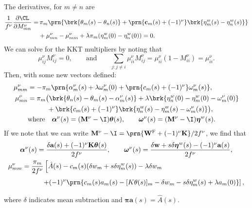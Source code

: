 \documentclass[12pt]{article}
\newcommand{\eqm}{\pi}
\newcommand{\eq}{\boldsymbol{\eqm}}
\newcommand{\etwm}{\eta^w}
\newcommand{\etw}{\boldsymbol{\eta}^w}
\newcommand{\thbm}{\theta}
\newcommand{\thb}{\boldsymbol{\thbm}}
\newcommand{\ombm}{\omega}
\newcommand{\omb}{\boldsymbol{\ombm}}
\newcommand{\albm}{\alpha}
\newcommand{\alb}{\boldsymbol{\albm}}
\newcommand{\wm}{w}
\newcommand{\w}{\mathbf{\wm}}
\newcommand{\Wm}{W}
\newcommand{\W}{\mathbf{\Wm}}
\newcommand{\MMdm}{M}
\newcommand{\MMd}{\mathbf{\MMdm}}
\newcommand{\encm}{K}
\newcommand{\enc}{\mathbf{\encm}}
\newcommand{\frg}{\W^{\mathrm{F}}}
\renewcommand{\pdiff}[2]{\frac{\partial #1}{\partial #2}}
\begin{document}
The derivatives, for \(m \neq n\) are
%
\begin{equation}\label{eq:finitederivs}
\begin{aligned}
  \frac{1}{f^\nu} \pdiff{\CL}{\MMdm^\nu_{mn}} = & \,
    \eqm_m \prn{ \brk{\thbm_m(s) - \thbm_n(s)}
     + \prn{\mathbf{c}_m(s) + (-1)^\nu} \brk{\etwm_m(s) - \etwm_n(s)} } \\
     &+ \mu^\nu_{mn} -  \mu^\nu_{mm}
     + \lambda \eqm_m (\etwm_{m}(0)-\etwm_{n}(0)) 
    = 0.
\end{aligned}
\end{equation}
%
We can solve for the KKT multipliers by noting that
%
\begin{equation*}
  \mu^\nu_{ij} \MMdm^\nu_{ij} = 0,
  \qquad \text{and} \qquad
  \sum_{j: j \neq i} \mu^\nu_{ii} \MMdm^\nu_{ij} 
      = \mu^\nu_{ii} (1 - \MMdm^\nu_{ii}) = \mu^\nu_{ii}.
\end{equation*}
%
Then, with some new vectors defined:
%
\begin{equation}\label{eq:kktsol}
\begin{aligned}
  \mu^\nu_{mm} &= - \eqm_m \prn{ \albm^\nu_m(s) 
    + \lambda \ombm^\nu_m(0) 
    + \prn{{c}_m(s) + (-1)^\nu} \ombm^\nu_m(s)
    }, \\
  \mu^\nu_{mn} &= \eqm_m \big( 
      \brk{ \thbm_n(s) - \thbm_m(s) - \albm^\nu_m(s) }
    + \lambda \brk{ \etwm_n(0) - \etwm_m(0) - \ombm^\nu_m(0) } 
  \\ &\phantom{= \eqm_m \big( }
    + \brk{{c}_m(s) + (-1)^\nu} 
        \brk{ \etwm_n(s) - \etwm_m(s) - \ombm^\nu_m(s) }
     \big), \\
  &\text{where} \quad 
  \alb^\nu(s) = (\MMd^\nu - \I) \thb(s), \qquad
  \omb^\nu(s) = (\MMd^\nu - \I) \etw(s).
\end{aligned}
\end{equation}
%
If we note that we can write \( \MMd^\nu - \I = \prn{\frg + (-1)^\nu \enc} / 2f^\nu \), we find that
%
\begin{equation}\label{eq:diagKKT}
\begin{gathered}
  \alb^\nu(s) = \frac{\delta \mathbf{a}(s) + (-1)^\nu \enc \thb(s)}
                     {2f^\nu},
  \qquad 
  \omb^\nu(s) = \frac{\delta \w + s \delta \etw(s) - (-1)^\nu \mathbf{a}(s)}
                     {2 f^\nu}, \\
\begin{aligned}
  \mu^\nu_{mm} &= \frac{\eqm_m}{2f^\nu} 
    \left[ 
      \hat{A}(s) - c_m(s) (\delta \wm_m + s \delta \etwm_m(s))
      - \lambda \delta w_m
    \right. \\ &\phantom{= \frac{\eqm_m}{2f^\nu} }
    \left.
      + (-1)^\nu \prn{ 
        c_m(s) a_m(s) - [\encm \thbm(s)]_m
        - \delta \wm_m - s \delta \etwm_m(s)
        + \lambda a_m(0)
      }
    \right], \\
\end{aligned}
\end{gathered}
\end{equation}
%
where \(\delta\) indicates mean subtraction and \(\eq \mathbf{a}(s) = \hat{A}(s)\).
\end{document}
